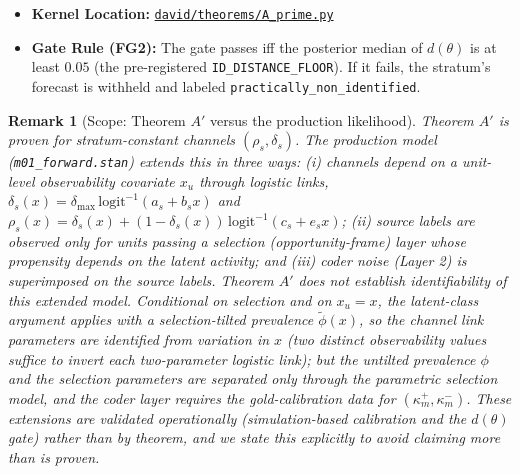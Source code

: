 \documentclass[11pt,a4paper]{article}
\newtheorem{remark}{Remark}
\begin{document}
\begin{itemize}
    \item \textbf{Kernel Location:} \href{file:///Users/arbenlila/development/david/canonical/david/theorems/A_prime.py}{\texttt{david/theorems/A\_prime.py}}
    \item \textbf{Gate Rule (FG2):} The gate passes iff the posterior median of $d(\theta)$ is at least $0.05$ (the pre-registered \texttt{ID\_DISTANCE\_FLOOR}). If it fails, the stratum's forecast is withheld and labeled \texttt{practically\_non\_}\allowbreak\texttt{identified}.
\end{itemize}

\begin{remark}[Scope: Theorem $A'$ versus the production likelihood]
Theorem $A'$ is proven for stratum-constant channels $(\rho_s, \delta_s)$. The production model (\texttt{m01\_forward.stan}) extends this in three ways: (i) channels depend on a unit-level observability covariate $x_u$ through logistic links, $\delta_s(x) = \delta_{\max}\,\mathrm{logit}^{-1}(a_s + b_s x)$ and $\rho_s(x) = \delta_s(x) + (1 - \delta_s(x))\,\mathrm{logit}^{-1}(c_s + e_s x)$; (ii) source labels are observed only for units passing a selection (opportunity-frame) layer whose propensity depends on the latent activity; and (iii) coder noise (Layer 2) is superimposed on the source labels. Theorem $A'$ does \emph{not} establish identifiability of this extended model. Conditional on selection and on $x_u = x$, the latent-class argument applies with a selection-tilted prevalence $\tilde{\phi}(x)$, so the channel link parameters are identified from variation in $x$ (two distinct observability values suffice to invert each two-parameter logistic link); but the untilted prevalence $\phi$ and the selection parameters are separated only through the parametric selection model, and the coder layer requires the gold-calibration data for $(\kappa^+_m, \kappa^-_m)$. These extensions are validated operationally (simulation-based calibration and the $d(\theta)$ gate) rather than by theorem, and we state this explicitly to avoid claiming more than is proven. %
\end{remark}
\end{document}

